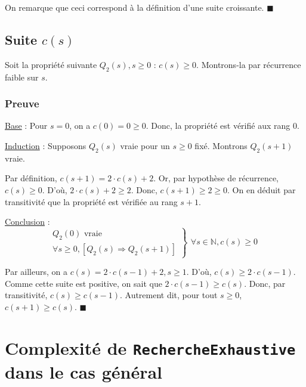 \documentclass[12pt,a4paper]{article}
\begin{document}
\begin{appendices}
On remarque que ceci correspond \`a la d\'efinition d'une suite croissante. \hfill\ensuremath{\blacksquare}

\subsection*{Suite $c(s)$}
Soit la propri\'et\'e suivante $Q_{2}(s), s \geq 0$ : $c(s) \geq 0$.
Montrons-la par r\'ecurrence faible sur $s$.

\subsubsection*{Preuve}
\underline{Base} : Pour $s = 0$, on a $c(0) = 0 \geq 0$. 
Donc, la propri\'et\'e est v\'erifi\'e aux rang 0.

\medskip
\underline{Induction} : Supposons $Q_{2}(s)$ vraie pour un $s \geq 0$ fix\'e. 
Montrons $Q_{2}(s+1)$ vraie.

\smallskip
Par d\'efinition, $c(s+1) = 2\cdot c(s) + 2$.
Or, par hypoth\`ese de r\'ecurrence, $c(s) \geq 0$. D'o\`u, $2\cdot c(s)+2 \geq 2$.
Donc, $c(s+1) \geq 2 \geq 0$. On en d\'eduit par transitivit\'e que la propri\'et\'e est v\'erifi\'ee au rang $s+1$.

\medskip
\underline{Conclusion} : 
\begin{equation*}
\left .\begin{array}{l}
Q_{2}(0) \text{ vraie } \\
\forall s \geq 0, [Q_{2}(s) \Rightarrow Q_{2}(s+1) ]
\end{array} \right \}
\left .\begin{array}{l}
\forall s \in \mathbb{N}, c(s) \geq 0
\end{array}\right .
\end{equation*}

Par ailleurs, on a $c(s) = 2\cdot c(s-1) + 2, s \geq 1$. D'o\`u, $c(s) \geq 2\cdot c(s-1)$.
Comme cette suite est positive, on sait que $2\cdot c(s-1) \geq c(s)$. Donc, par transitivit\'e, $c(s) \geq c(s-1)$. Autrement dit, pour tout $s \geq 0$, $c(s+1) \geq c(s)$. 
\hfill\ensuremath{\blacksquare}

\newpage
\section{Complexit\'e de \texttt{RechercheExhaustive} dans le cas g\'en\'eral}

\end{appendices}
	
\printindex
\end{document}
